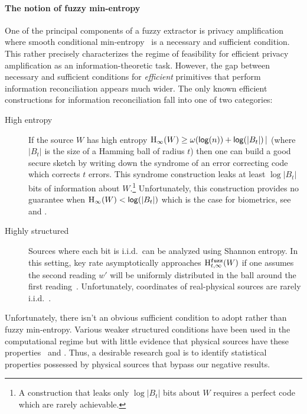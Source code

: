 \paragraph{The notion of fuzzy min-entropy}
One of the principal components of a fuzzy extractor is privacy amplification where smooth conditional min-entropy~\cite{renner2005simple} is a necessary and sufficient condition.  This rather precisely characterizes the regime
of feasibility for efficient privacy amplification as an
information-theoretic task.  However, the gap between necessary and sufficient conditions for \emph{efficient} primitives that perform information reconciliation appears much wider. The only known efficient constructions for information reconciliation fall into one of two categories:
\begin{description}
\item[High entropy] If the source $W$ has high entropy $\mathrm{H}_\infty(W)\ge \omega(\mathsf{log}\!\left(n\right)) + \mathsf{log}\!\left(|B_t|\right)|$ (where $|B_t|$ is the size of a Hamming ball of radius $t$) then one can build a good secure sketch by writing down the syndrome of an error correcting code which corrects $t$ errors.  This syndrome construction  leaks at least $\log{|B_t|}$ bits of information about $W$.\footnote{A construction that leaks only $\log{|B_t|}$ bits about $W$ requires a perfect code which are rarely achievable.}  Unfortunately, this construction provides no guarantee when $\mathrm{H}_\infty(W)< \mathsf{log}\!\left(|B_t|\right)$ which is the case for biometrics, see \cite[Proposition 1]{canetti2021reusable} and \cite[Introduction]{simhadri2019cryptographic}.
\item[Highly structured] Sources where each bit is i.i.d.\ can be analyzed using Shannon entropy.  In this setting, key rate asymptotically approaches $\mathrm{H}^{\mathtt{fuzz}}_{t,\infty}(W)$ if one assumes the second reading $w'$ will be uniformly distributed in the ball around the first reading~\cite[Theorem 2]{tuyls2004capacity}.  Unfortunately, coordinates of real-physical sources are rarely i.i.d.~\cite{daugman2004}.
\end{description}

Unfortunately, there isn't an obvious sufficient condition to adopt
rather than fuzzy min-entropy.  Various weaker structured conditions
have been used in the computational regime but with little evidence
that physical sources have these properties~\cite[Figure
1]{demarest2021code} and \cite{simhadri2019cryptographic}. Thus, a desirable
research goal is to identify statistical properties possessed by physical
sources that bypass our negative results.

